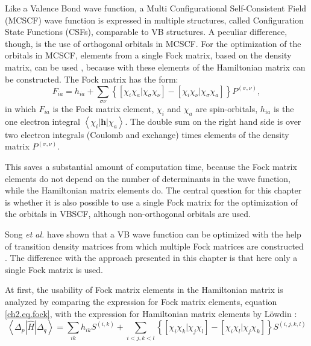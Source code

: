 Like a Valence Bond wave function, a Multi Configurational Self-Consistent Field (MCSCF) \cite{joop,mcscf,roos1,roos2} wave function is expressed in multiple structures, called Configuration State Functions (CSFs), comparable to VB structures. A peculiar difference, though, is the use of orthogonal orbitals in MCSCF. For the optimization of the orbitals in MCSCF, elements from a single Fock matrix, based on the density matrix, can be used \cite{roos1}, because with these elements of the Hamiltonian matrix can be constructed. The Fock matrix has the form:
\begin{equation}
F_{ia} = h_{ia} + \sum_{\sigma\nu} \left\{ \left[ \chi_i \chi_a | \chi_\sigma \chi_\nu \right] - \left[ \chi_i \chi_\nu | \chi_\sigma \chi_a \right] \right\} P^{(\sigma,\nu)},
\label{ch2.eq.fock}
\end{equation}
in which $F_{ia}$ is the Fock matrix element, $\chi_i$ and $\chi_a$ are spin-orbitals, $h_{ia}$ is the one electron integral $\left< \chi_i | \mathbf{h}| \chi_a \right>$. The double sum on the right hand side is over two electron integrals (Coulomb and exchange) times elements of the density matrix $P^{(\sigma,\nu)}$. 

This saves a substantial amount of computation time, because the Fock matrix elements do not depend on the number of determinants in the wave function, while the Hamiltonian matrix elements do. The central question for this chapter is whether it is also possible to use a single Fock matrix for the optimization of the orbitals in VBSCF, although non-orthogonal orbitals are used.

Song \textit{et al.} have shown that a VB wave function can be optimized with the help of transition density matrices from which multiple Fock matrices are constructed \cite{song}. The difference with the approach presented in this chapter is that here only a single Fock matrix is used.
 
At first, the usability of Fock matrix elements in the Hamiltonian matrix is analyzed by comparing the expression for Fock matrix elements, equation \ref{ch2.eq.fock}, with the expression for Hamiltonian matrix elements by L\"{o}wdin \cite{lowdin}:
\begin{equation}
\left< \Delta_p | \hat{H} | \Delta_q \right> = \sum_{ik} h_{ik}S^{(i,k)} + \sum_{i<j,k<l} \left\{ \left[ \chi_i \chi_k | \chi_j \chi_l \right] - \left[ \chi_i \chi_l | \chi_j \chi_k \right] \right\}S^{(i,j,k,l)}  
\label{ch2.eq.lowdindeterminants}
\end{equation}


